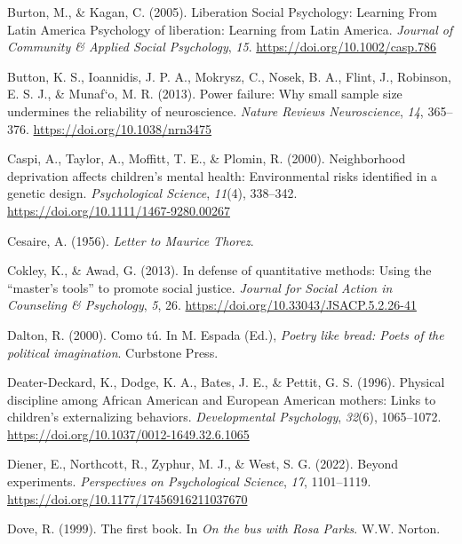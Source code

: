 \documentclass[
  letterpaper,
  DIV=11,
  numbers=noendperiod]{scrreprt}
\newlength{\cslhangindent}
\newlength{\cslentryspacingunit} %
\newenvironment{CSLReferences}[2] %
 {%
  \setlength{\parindent}{0pt}
  \ifodd #1
  \let\oldpar\par
  \def\par{\hangindent=\cslhangindent\oldpar}
  \fi
  \setlength{\parskip}{#2\cslentryspacingunit}
 }%
 {}
\begin{document}
\begin{CSLReferences}{1}{0}
\leavevmode{}%
Burton, M., \& Kagan, C. (2005). {Liberation Social Psychology: Learning
From Latin America Psychology of liberation: Learning from Latin
America}. \emph{Journal of Community \& Applied Social Psychology},
\emph{15}. \url{https://doi.org/10.1002/casp.786}

\leavevmode{}%
Button, K. S., Ioannidis, J. P. A., Mokrysz, C., Nosek, B. A., Flint,
J., Robinson, E. S. J., \& Munaf`o, M. R. (2013). Power failure: Why
small sample size undermines the reliability of neuroscience.
\emph{Nature Reviews Neuroscience}, \emph{14}, 365--376.
\url{https://doi.org/10.1038/nrn3475}

\leavevmode{}%
Caspi, A., Taylor, A., Moffitt, T. E., \& Plomin, R. (2000).
Neighborhood deprivation affects children's mental health: Environmental
risks identified in a genetic design. \emph{Psychological Science},
\emph{11}(4), 338--342. \url{https://doi.org/10.1111/1467-9280.00267}

\leavevmode{}%
Cesaire, A. (1956). \emph{Letter to {M}aurice {T}horez}.

\leavevmode{}%
Cokley, K., \& Awad, G. (2013). In defense of quantitative methods:
Using the {``master's tools''} to promote social justice. \emph{Journal
for Social Action in Counseling \& Psychology}, \emph{5}, 26.
\url{https://doi.org/10.33043/JSACP.5.2.26-41}

\leavevmode{}%
Dalton, R. (2000). Como t{ú}. In M. Espada (Ed.), \emph{Poetry like
bread: Poets of the political imagination}. Curbstone Press.

\leavevmode{}%
Deater-Deckard, K., Dodge, K. A., Bates, J. E., \& Pettit, G. S. (1996).
{Physical discipline among African American and European American
mothers: Links to children's externalizing behaviors.}
\emph{Developmental Psychology}, \emph{32}(6), 1065--1072.
\url{https://doi.org/10.1037/0012-1649.32.6.1065}

\leavevmode{}%
Diener, E., Northcott, R., Zyphur, M. J., \& West, S. G. (2022). Beyond
experiments. \emph{Perspectives on Psychological Science}, \emph{17},
1101--1119. \url{https://doi.org/10.1177/17456916211037670}

\leavevmode{}%
Dove, R. (1999). The first book. In \emph{On the bus with {R}osa
{P}arks}. W.W. Norton.


\end{CSLReferences}
\end{document}
